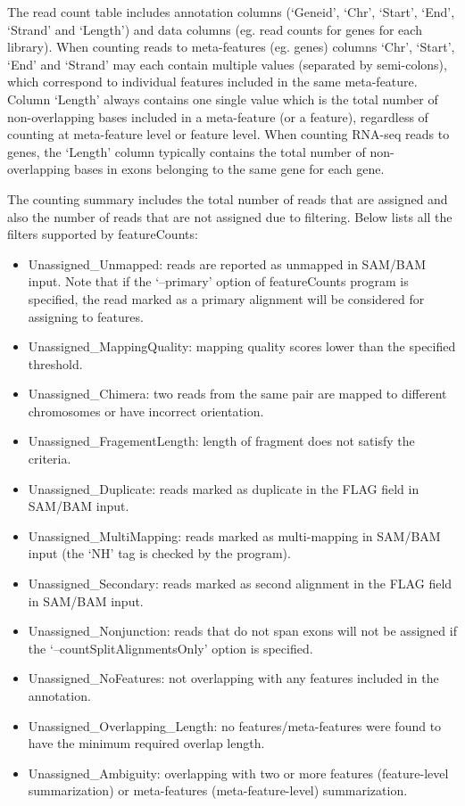\documentclass[12pt]{report}
\newcommand{\featureCounts}{\textsf{featureCounts}}
\begin{document}
The read count table includes annotation columns (`Geneid', `Chr', `Start', `End', `Strand' and `Length') and data columns (eg. read counts for genes for each library).
When counting reads to meta-features (eg. genes) columns `Chr', `Start', `End' and `Strand' may each contain multiple values (separated by semi-colons), which correspond to individual features included in the same meta-feature. 
Column `Length' always contains one single value which is the total number of non-overlapping bases included in a meta-feature (or a feature), regardless of counting at meta-feature level or feature level.
When counting RNA-seq reads to genes, the `Length' column typically contains the total number of non-overlapping bases in exons belonging to the same gene for each gene.

The counting summary includes the total number of reads that are assigned and also the number of reads that are not assigned due to filtering.
Below lists all the filters supported by {\featureCounts}:

\begin{itemize}
\item Unassigned\_Unmapped: reads are reported as unmapped in SAM/BAM input. Note that if the `--primary' option of featureCounts program is specified, the read marked as a primary alignment will be considered for assigning to features.
\item Unassigned\_MappingQuality: mapping quality scores lower than the specified threshold.
\item Unassigned\_Chimera: two reads from the same pair are mapped to different chromosomes or have incorrect orientation.
\item Unassigned\_FragementLength: length of fragment does not satisfy the criteria.
\item Unassigned\_Duplicate: reads marked as duplicate in the FLAG field in SAM/BAM input.
\item Unassigned\_MultiMapping: reads marked as multi-mapping in SAM/BAM input (the `NH' tag is checked by the program).
\item Unassigned\_Secondary: reads marked as second alignment in the FLAG field in SAM/BAM input. 	
\item Unassigned\_Nonjunction: reads that do not span exons will not be assigned if the `--countSplitAlignmentsOnly' option is specified.
\item Unassigned\_NoFeatures: not overlapping with any features included in the annotation.
\item Unassigned\_Overlapping\_Length: no features/meta-features were found to have the minimum required overlap length.
\item Unassigned\_Ambiguity: overlapping with two or more features (feature-level summarization) or meta-features (meta-feature-level) summarization.
\end{itemize}
\end{document}
